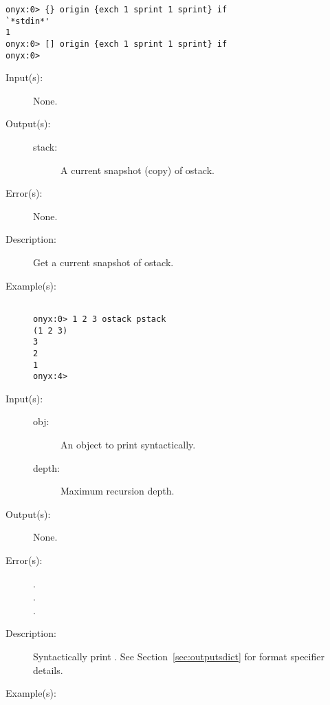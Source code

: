 \begin{description}
\begin{description}
\begin{verbatim}
onyx:0> {} origin {exch 1 sprint 1 sprint} if
`*stdin*'
1
onyx:0> [] origin {exch 1 sprint 1 sprint} if
onyx:0>
		\end{verbatim}
	\end{description}
\label{systemdict:ostack}
\item[{\onyxop{--}{ostack}{stack}}: ]
	\begin{description}\item[]
	\item[Input(s): ] None.
	\item[Output(s): ]
		\begin{description}\item[]
		\item[stack: ]
			A current snapshot (copy) of ostack.
		\end{description}
	\item[Error(s): ] None.
	\item[Description: ]
		Get a current snapshot of ostack.
	\item[Example(s): ]\begin{verbatim}

onyx:0> 1 2 3 ostack pstack
(1 2 3)
3
2
1
onyx:4>
		\end{verbatim}
	\end{description}
\label{systemdict:output}
\item[{\onyxop{obj depth}{output}{--}}: ]
	\begin{description}\item[]
	\item[Input(s): ]
		\begin{description}\item[]
		\item[obj: ]
			An object to print syntactically.
		\item[depth: ]
			Maximum recursion depth.
		\end{description}
	\item[Output(s): ] None.
	\item[Error(s): ]
		\begin{description}\item[]
		\item[.]
		\item[.]
		\item[.]
		\end{description}
	\item[Description: ]
		Syntactically print .  See
		Section~\ref{sec:outputsdict} for format specifier details.
	\item[Example(s): ]\begin{verbatim}


\end{verbatim}
\end{description}
\end{description}
